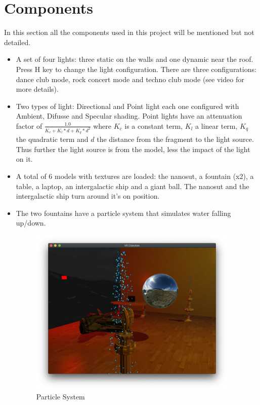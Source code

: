 \documentclass{article}
\begin{document}
\section {Components}
In this section all the components used in this project will be mentioned but not detailed.
\begin{itemize}
  \item A set of four lights: three static on the walls and one dynamic near the roof. Press H key to change the light configuration. There are three configurations: dance club mode, rock concert mode and techno club mode (see video for more details).
  \item Two types of light: Directional and Point light each one configured with Ambient, Difusse and Specular shading. Point lights have an attenuation factor of
  $\frac{1.0}{K_c + K_l*d + K_q*d^2}$ where $K_c$ is a constant term, $K_l$ a linear term, $K_q$ the quadratic term and $d$ the distance from the fragment to the light source. Thus further the light source is from the model, less the impact of the light on it.
  \item A total of 6 models with textures are loaded: the nanosut, a fountain (x2), a table, a laptop, an intergalactic ship and a giant ball. The nanosut and the intergalactic ship turn around it's on position.
  \item The two fountains have a particle system that simulates water falling up/down.
  \begin{figure}[htp]
        \centering
        \includegraphics[width=10cm]{particles.png}
        \caption{Particle System}
        \label{fig:galaxy}
    \end{figure}
    

\end{itemize}
\end{document}
